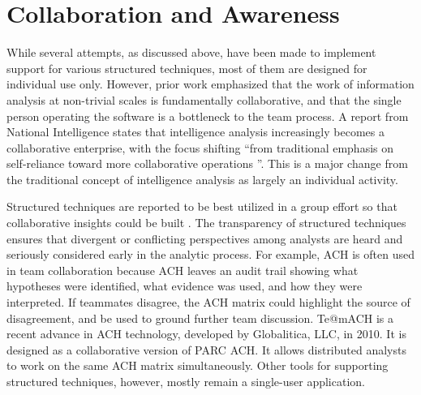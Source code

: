 \section{Collaboration and Awareness}

While several attempts, as discussed above, have been made to implement support for various structured techniques, most of them are designed for individual use only. However, prior work \citep{Chin2009, Warner2008} emphasized that the work of information analysis at non-trivial scales is fundamentally collaborative, and that the single person operating the software is a bottleneck to the team process. A report from National Intelligence \citep{Vision2015} states that intelligence analysis increasingly becomes a collaborative enterprise, with the focus shifting “from traditional emphasis on self-reliance toward more collaborative operations ”. This is a major change from the traditional concept of intelligence analysis as largely an individual activity.

Structured techniques are reported to be best utilized in a group effort so that collaborative insights could be built \citep{Heuer1999}. The transparency of structured techniques ensures that divergent or conflicting perspectives among analysts are heard and seriously considered early in the analytic process. For example, ACH is often used in team collaboration because ACH leaves an audit trail showing what hypotheses were identified, what evidence was used, and how they were interpreted. If teammates disagree, the ACH matrix could highlight the source of disagreement, and be used to ground further team discussion. Te@mACH is a recent advance in ACH technology, developed by Globalitica, LLC, in 2010. It is designed as a collaborative version of PARC ACH. It allows distributed analysts to work on the same ACH matrix simultaneously. Other tools for supporting structured techniques, however, mostly remain a single-user application. 


